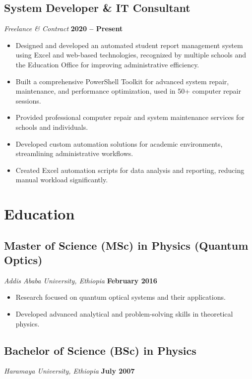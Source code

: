 \documentclass[11pt]{article}
\begin{document}
\subsection{System Developer \& IT Consultant}
\textit{Freelance \& Contract} \hfill \textbf{2020 -- Present}

\begin{itemize}[leftmargin=1.5em, itemsep=0.3em]
    \item Designed and developed an automated student report management system using Excel and web-based technologies, recognized by multiple schools and the Education Office for improving administrative efficiency.
    \item Built a comprehensive PowerShell Toolkit for advanced system repair, maintenance, and performance optimization, used in 50+ computer repair sessions.
    \item Provided professional computer repair and system maintenance services for schools and individuals.
    \item Developed custom automation solutions for academic environments, streamlining administrative workflows.
    \item Created Excel automation scripts for data analysis and reporting, reducing manual workload significantly.
\end{itemize}

\section{Education}

\subsection{Master of Science (MSc) in Physics (Quantum Optics)}
\textit{Addis Ababa University, Ethiopia} \hfill \textbf{February 2016}

\begin{itemize}[leftmargin=1.5em, itemsep=0.2em]
    \item Research focused on quantum optical systems and their applications.
    \item Developed advanced analytical and problem-solving skills in theoretical physics.
\end{itemize}

\subsection{Bachelor of Science (BSc) in Physics}
\textit{Haramaya University, Ethiopia} \hfill \textbf{July 2007}
\end{document}

